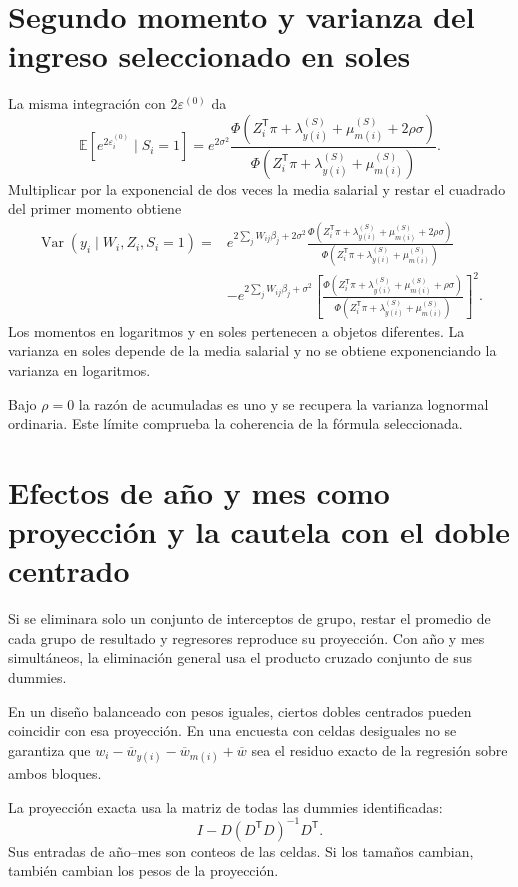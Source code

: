\documentclass[11pt,a4paper]{article}
\newcommand{\E}{\mathbb E}
\DeclareMathOperator{\Var}{Var}
\begin{document}
\clearpage
\section{Segundo momento y varianza del ingreso seleccionado en soles}

La misma integración con $2\varepsilon^{(0)}$ da
\[
\E[e^{2\varepsilon_i^{(0)}}\mid S_i=1]
=e^{2\sigma^2}
\frac{\Phi(Z_i^{\mathsf T}\pi+\lambda_{y(i)}^{(S)}+\mu_{m(i)}^{(S)}+2\rho\sigma)}
{\Phi(Z_i^{\mathsf T}\pi+\lambda_{y(i)}^{(S)}+\mu_{m(i)}^{(S)})}.
\]
Multiplicar por la exponencial de dos veces la media salarial y restar el cuadrado del primer momento obtiene
\[
\begin{aligned}
\Var(y_i\mid W_i,Z_i,S_i=1)
={}&e^{2\sum_jW_{ij}\beta_j+2\sigma^2}
\frac{\Phi(Z_i^{\mathsf T}\pi+\lambda_{y(i)}^{(S)}+\mu_{m(i)}^{(S)}+2\rho\sigma)}
{\Phi(Z_i^{\mathsf T}\pi+\lambda_{y(i)}^{(S)}+\mu_{m(i)}^{(S)})}\\
&-e^{2\sum_jW_{ij}\beta_j+\sigma^2}
\left[
\frac{\Phi(Z_i^{\mathsf T}\pi+\lambda_{y(i)}^{(S)}+\mu_{m(i)}^{(S)}+\rho\sigma)}
{\Phi(Z_i^{\mathsf T}\pi+\lambda_{y(i)}^{(S)}+\mu_{m(i)}^{(S)})}
\right]^2.
\end{aligned}
\]
Los momentos en logaritmos y en soles pertenecen a objetos diferentes. La varianza en soles depende de la media salarial y no se obtiene exponenciando la varianza en logaritmos.

Bajo $\rho=0$ la razón de acumuladas es uno y se recupera la varianza lognormal ordinaria. Este límite comprueba la coherencia de la fórmula seleccionada.

\clearpage
\section{Efectos de año y mes como proyección y la cautela con el doble centrado}

Si se eliminara solo un conjunto de interceptos de grupo, restar el promedio de cada grupo de resultado y regresores reproduce su proyección. Con año y mes simultáneos, la eliminación general usa el producto cruzado conjunto de sus dummies.

En un diseño balanceado con pesos iguales, ciertos dobles centrados pueden coincidir con esa proyección. En una encuesta con celdas desiguales no se garantiza que
$w_i-\overline w_{y(i)}-\overline w_{m(i)}+\overline w$
sea el residuo exacto de la regresión sobre ambos bloques.

La proyección exacta usa la matriz de todas las dummies identificadas:
\[
I-D(D^{\mathsf T}D)^{-1}D^{\mathsf T}.
\]
Sus entradas de año--mes son conteos de las celdas. Si los tamaños cambian, también cambian los pesos de la proyección.
\end{document}
